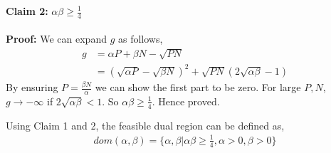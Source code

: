 \documentclass{article} %
\begin{document}
\textbf{Claim 2:} $\alpha\beta \geq \frac{1}{4}$\\ \\
\textbf{Proof:} We can expand $g$ as follows,
\begin{align*}
g &= \alpha P+\beta N-\sqrt{PN}\\
&=(\sqrt{\alpha P}-\sqrt{\beta N})^2+\sqrt{PN}(2\sqrt{\alpha\beta}-1)
\end{align*}
By ensuring $P=\frac{\beta N}{\alpha}$ we can show the first part to be zero. For large $P,N$, $g \to -\infty$  if $2\sqrt{\alpha\beta}<1$. So $\alpha\beta \geq \frac{1}{4}$. Hence proved.

Using Claim 1 and 2, the feasible dual region can be defined as,
\begin{align*}
dom(\alpha,\beta) = \{\alpha,\beta|\alpha\beta \geq \frac{1}{4},\alpha > 0,\beta > 0\}
\end{align*}



\end{document}
